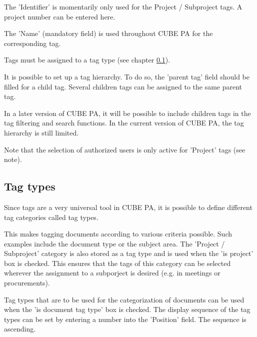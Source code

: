 The 'Identifier' is momentarily only used for the Project / Subproject tags. A project number can be entered here.

\vspace{\baselineskip}

The 'Name' (mandatory field) is used throughout CUBE PA for the corresponding tag.

\vspace{\baselineskip}

Tags must be assigned to a tag type (see chapter \ref{bkm:Ref444100222}).

\vspace{\baselineskip}

It is possible to set up a tag hierarchy. To do so, the 'parent tag' field should be filled for a child tag. Several children tags can be assigned to the same parent tag.

\vspace{\baselineskip}

In a later version of CUBE PA, it will be possible to include children tags in the tag filtering and search functions. In the current version of CUBE PA, the tag hierarchy is still limited.

\vspace{\baselineskip}

Note that the selection of authorized users is only active for 'Project' tags (see note).

\subsection{Tag types}
\label{bkm:Ref444100222}
Since tags are a very universal tool in CUBE PA, it is possible to define different tag categories called tag types.\newline

This makes tagging documents according to various criteria possible. Such examples include the document type or the subject area. The 'Project / Subproject' category is also stored as a tag type and is used when the 'is project' box is checked. This ensures that the tags of this category can be selected wherever the assignment to a subporject is desired (e.g. in meetings or procurements). \newline

Tag types that are to be used for the categorization of documents can be used when the 'is document tag type' box is checked. The display sequence of the tag types can be set by entering a number into the 'Position' field. The sequence is ascending.

